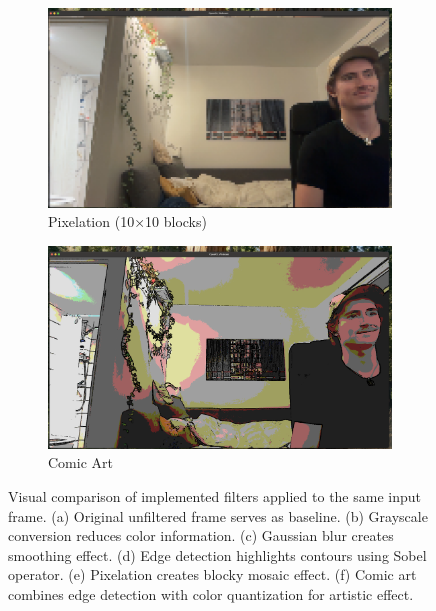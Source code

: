 \documentclass[12pt,a4paper]{article}
\begin{document}
\begin{figure}[H]
    \begin{subfigure}[b]{0.20\textwidth}
        \centering
        \includegraphics[width=\textwidth]{filters/pixelatio.png}
        \caption{Pixelation (10×10 blocks)}
        \label{fig:filter_pixelation}
    \end{subfigure}
    \hfill
    \begin{subfigure}[b]{0.20\textwidth}
        \centering
        \includegraphics[width=\textwidth]{filters/comic.png}
        \caption{Comic Art}
        \label{fig:filter_comic}
    \end{subfigure}
    
    \caption{Visual comparison of implemented filters applied to the same input frame. (a) Original unfiltered frame serves as baseline. (b) Grayscale conversion reduces color information. (c) Gaussian blur creates smoothing effect. (d) Edge detection highlights contours using Sobel operator. (e) Pixelation creates blocky mosaic effect. (f) Comic art combines edge detection with color quantization for artistic effect.}
    \label{fig:filter_comparison}
\end{figure}
\end{document}
